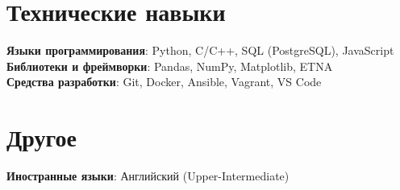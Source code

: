 \section{Технические навыки}
\begin{itemize}[leftmargin=0.15in, label={}]
  \small{\item{
        \textbf{Языки программирования}{: Python, C/C++, SQL (PostgreSQL), JavaScript} \\
        \textbf{Библиотеки и фреймворки}{: Pandas, NumPy, Matplotlib, ETNA} \\
        \textbf{Средства разработки}{: Git, Docker, Ansible, Vagrant, VS Code} \\
        }}
\end{itemize}

\section{Другое}
\begin{itemize}[leftmargin=0.15in, label={}]
  \small{\item{
        \textbf{Иностранные языки}{: Английский (Upper-Intermediate)} \\
        }}
\end{itemize}

